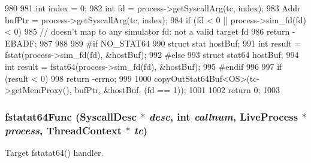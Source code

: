 \begin{DoxyCode}
980 {
981     int index = 0;
982     int fd = process->getSyscallArg(tc, index);
983     Addr bufPtr = process->getSyscallArg(tc, index);
984     if (fd < 0 || process->sim_fd(fd) < 0) {
985         // doesn't map to any simulator fd: not a valid target fd
986         return -EBADF;
987     }
988 
989 #if NO_STAT64
990     struct stat  hostBuf;
991     int result = fstat(process->sim_fd(fd), &hostBuf);
992 #else
993     struct stat64  hostBuf;
994     int result = fstat64(process->sim_fd(fd), &hostBuf);
995 #endif
996 
997     if (result < 0)
998         return -errno;
999 
1000     copyOutStat64Buf<OS>(tc->getMemProxy(), bufPtr, &hostBuf, (fd == 1));
1001 
1002     return 0;
1003 }
\end{DoxyCode}
\hypertarget{syscall__emul_8hh_acc27dba349a051153a090505227b4b9c}{
\subsubsection[{fstatat64Func}]{ fstatat64Func ({\bf SyscallDesc} $\ast$ {\em desc}, \/  int {\em callnum}, \/  {\bf LiveProcess} $\ast$ {\em process}, \/  {\bf ThreadContext} $\ast$ {\em tc})}}
\label{syscall__emul_8hh_acc27dba349a051153a090505227b4b9c}


Target fstatat64() handler. 


